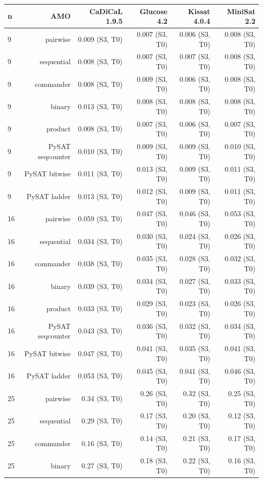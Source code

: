 \begin{tabular}{lrrrrr}
\toprule
n & AMO & CaDiCaL 1.9.5 & Glucose 4.2 & Kissat 4.0.4 & MiniSat 2.2 \\
\midrule
9 & pairwise & 0.009 (S3, T0) & 0.007 (S3, T0) & 0.006 (S3, T0) & 0.008 (S3, T0) \\
9 & sequential & 0.008 (S3, T0) & 0.007 (S3, T0) & 0.007 (S3, T0) & 0.008 (S3, T0) \\
9 & commander & 0.008 (S3, T0) & 0.009 (S3, T0) & 0.006 (S3, T0) & 0.008 (S3, T0) \\
9 & binary & 0.013 (S3, T0) & 0.008 (S3, T0) & 0.008 (S3, T0) & 0.008 (S3, T0) \\
9 & product & 0.008 (S3, T0) & 0.007 (S3, T0) & 0.006 (S3, T0) & 0.007 (S3, T0) \\
9 & PySAT seqcounter & 0.010 (S3, T0) & 0.009 (S3, T0) & 0.009 (S3, T0) & 0.010 (S3, T0) \\
9 & PySAT bitwise & 0.011 (S3, T0) & 0.013 (S3, T0) & 0.009 (S3, T0) & 0.011 (S3, T0) \\
9 & PySAT ladder & 0.013 (S3, T0) & 0.012 (S3, T0) & 0.009 (S3, T0) & 0.011 (S3, T0) \\
16 & pairwise & 0.059 (S3, T0) & 0.047 (S3, T0) & 0.046 (S3, T0) & 0.053 (S3, T0) \\
16 & sequential & 0.034 (S3, T0) & 0.030 (S3, T0) & 0.024 (S3, T0) & 0.026 (S3, T0) \\
16 & commander & 0.038 (S3, T0) & 0.035 (S3, T0) & 0.028 (S3, T0) & 0.032 (S3, T0) \\
16 & binary & 0.039 (S3, T0) & 0.034 (S3, T0) & 0.027 (S3, T0) & 0.033 (S3, T0) \\
16 & product & 0.033 (S3, T0) & 0.029 (S3, T0) & 0.023 (S3, T0) & 0.026 (S3, T0) \\
16 & PySAT seqcounter & 0.043 (S3, T0) & 0.036 (S3, T0) & 0.032 (S3, T0) & 0.034 (S3, T0) \\
16 & PySAT bitwise & 0.047 (S3, T0) & 0.041 (S3, T0) & 0.035 (S3, T0) & 0.041 (S3, T0) \\
16 & PySAT ladder & 0.053 (S3, T0) & 0.045 (S3, T0) & 0.041 (S3, T0) & 0.046 (S3, T0) \\
25 & pairwise & 0.34 (S3, T0) & 0.26 (S3, T0) & 0.32 (S3, T0) & 0.25 (S3, T0) \\
25 & sequential & 0.29 (S3, T0) & 0.17 (S3, T0) & 0.20 (S3, T0) & 0.12 (S3, T0) \\
25 & commander & 0.16 (S3, T0) & 0.14 (S3, T0) & 0.21 (S3, T0) & 0.17 (S3, T0) \\
25 & binary & 0.27 (S3, T0) & 0.18 (S3, T0) & 0.22 (S3, T0) & 0.16 (S3, T0) \\

\end{tabular}
